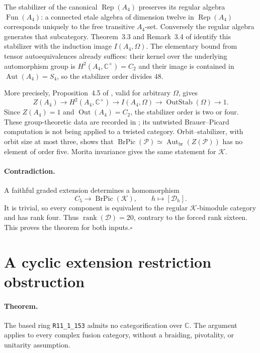 \documentclass[11pt,a4paper]{article}
\begin{document}
The stabilizer of the canonical $\operatorname{Rep}(A_4)$ preserves its
regular algebra $\operatorname{Fun}(A_4)$: a connected etale algebra of
dimension twelve in $\operatorname{Rep}(A_4)$ corresponds uniquely to the
free transitive $A_4$-set. Conversely the regular algebra generates that
subcategory. Theorem~3.3 and Remark~3.4 of \cite{MarshallNikshych} identify
this stabilizer with the induction image $I(A_4,\Omega)$.
The elementary bound from tensor autoequivalences already suffices:
their kernel over the underlying automorphism group is
$H^2(A_4,\mathbb C^\times)=C_2$ and their image is contained in
$\operatorname{Aut}(A_4)=S_4$, so the stabilizer order divides $48$.

More precisely, Proposition~4.5 of \cite{MarshallNikshych}, valid for
arbitrary $\Omega$, gives
\[
 Z(A_4)\longrightarrow H^2(A_4,\mathbb C^\times)
 \longrightarrow I(A_4,\Omega)
 \longrightarrow\operatorname{OutStab}(\Omega)\longrightarrow1.
\]
Since $Z(A_4)=1$ and $\operatorname{Out}(A_4)=C_2$, the stabilizer order
is two or four. These group-theoretic data are recorded in
\cite[Section~8.3]{NikshychRiepel}; its untwisted Brauer--Picard computation
is not being applied to a twisted category.
Orbit--stabilizer, with orbit size at most three, shows that
$\operatorname{BrPic}(\mathcal P)\simeq
\operatorname{Aut}_{\mathrm{br}}(Z(\mathcal P))$ has no element of order
five. Morita invariance gives the same statement for $\mathcal K$.

\paragraph{Contradiction.}
A faithful graded extension determines a homomorphism
\[
 C_5\longrightarrow\operatorname{BrPic}(\mathcal K),
 \qquad h\longmapsto[\mathcal D_h].
\]
It is trivial, so every component is equivalent to the regular
$\mathcal K$-bimodule category and has rank four. Thus
$\operatorname{rank}(\mathcal D)=20$, contrary to the forced rank sixteen.
This proves the theorem for both inputs.\hfill$\square$

\section{A cyclic extension restriction obstruction}
\label{sec:rank11-c4}

\paragraph{Theorem.}
The based ring \texttt{R11\_1\_153} admits no categorification over
$\mathbb C$. The argument applies to every complex fusion category,
without a braiding, pivotality, or unitarity assumption.
\end{document}
